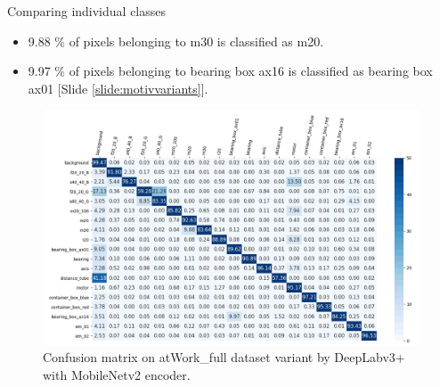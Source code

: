 \documentclass{beamer}
\begin{document}
\begin{frame}{Comparing individual classes}

	\begin{small}
		\begin{itemize}
			\item 9.88 \% of pixels belonging to m30 is classified as m20. 
			\item 9.97 \% of pixels belonging to bearing box ax16 is classified as bearing box ax01 [Slide \ref{slide:motivvariants}].
		\end{itemize}
	\end{small}		
	
	\begin{figure}[h]
		\centering
		\includegraphics[width=0.65\linewidth]{images/cm_full}
		\captionsetup{justification=centering,margin=0.2cm}
		\caption{Confusion matrix on atWork\_full dataset variant by DeepLabv3+ with MobileNetv2 encoder.}
		\label{Fig:variants}
	\end{figure}

\end{frame}
\end{document}
